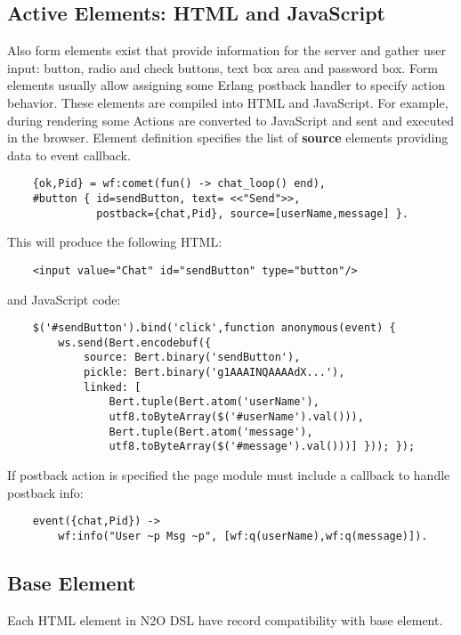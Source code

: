 \newpage
\subsection{Active Elements: HTML and JavaScript}
Also form elements exist that provide information for the server
and gather user input: button, radio and check buttons, text box area and password box.
Form elements usually allow assigning some Erlang postback handler to specify action behavior.
These elements are compiled into HTML and JavaScript. For example, during rendering some
Actions are converted to JavaScript and sent and executed in the browser.
Element definition specifies the list of {\bf source} elements providing data to event callback.

\vspace{1\baselineskip}
\begin{lstlisting}
    {ok,Pid} = wf:comet(fun() -> chat_loop() end),
    #button { id=sendButton, text= <<"Send">>, 
              postback={chat,Pid}, source=[userName,message] }.
\end{lstlisting}
\vspace{1\baselineskip}

This will produce the following HTML:
\begin{lstlisting}
    <input value="Chat" id="sendButton" type="button"/>
\end{lstlisting}
and JavaScript code:
\begin{lstlisting}
    $('#sendButton').bind('click',function anonymous(event) { 
        ws.send(Bert.encodebuf({
            source: Bert.binary('sendButton'), 
            pickle: Bert.binary('g1AAAINQAAAAdX...'),
            linked: [
                Bert.tuple(Bert.atom('userName'),
                utf8.toByteArray($('#userName').val())),
                Bert.tuple(Bert.atom('message'),
                utf8.toByteArray($('#message').val()))] })); });
\end{lstlisting}
\vspace{1\baselineskip}

If postback action is specified the page module must include a callback to handle postback info:
\vspace{1\baselineskip}
\begin{lstlisting}
    event({chat,Pid}) ->
        wf:info("User ~p Msg ~p", [wf:q(userName),wf:q(message)]).
\end{lstlisting}
\vspace{1\baselineskip}

\newpage
\subsection{Base Element}
Each HTML element in N2O DSL have record compatibility with base element.

